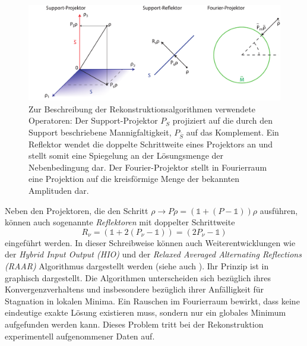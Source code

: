 \begin{figure}
	\centering
	\includegraphics[width=1\textwidth]{images/projektor.pdf}
	\caption[Operatoren zur Beschreibung der Rekonstruktionsalgorithmen]{Zur Beschreibung der Rekonstruktionsalgorithmen verwendete Operatoren: Der Support-Projektor $P_S$ projiziert auf die durch den Support beschriebene Mannigfaltigkeit, $P_{\bar{S}}$ auf das Komplement. Ein Reflektor wendet die doppelte Schrittweite eines Projektors an und stellt somit eine Spiegelung an der Lösungsmenge der Nebenbedingung dar. Der Fourier-Projektor stellt in Fourierraum eine Projektion auf die kreisförmige Menge der bekannten Amplituden dar.}
	\label{fig:projektoren}
\end{figure}
Neben den Projektoren, die den Schritt $\rho \rightarrow P\rho = (\mathbb{1}+(P-\mathbb{1}))\rho$ ausführen, können auch sogenannte \textit{Reflektoren} mit doppelter Schrittweite
\begin{equation}
	R_\nu= (\mathbb{1}+2(P_\nu-\mathbb{1}))=(2P_\nu-\mathbb{1})
\end{equation}
eingeführt werden.
In dieser Schreibweise können auch Weiterentwicklungen wie der \textit{Hybrid Input Output (HIO)} und  der \textit{Relaxed Averaged Alternating Reflections (RAAR)} Algorithmus dargestellt werden (siehe auch ). Ihr Prinzip ist in  graphisch dargestellt. Die Algorithmen unterscheiden sich bezüglich ihres Konvergenzverhaltens und insbesondere bezüglich ihrer Anfälligkeit für Stagnation in lokalen Minima. 
Ein Rauschen im Fourierraum bewirkt, dass keine eindeutige exakte Lösung existieren muss, sondern nur ein globales Minimum aufgefunden werden kann. Dieses Problem tritt bei der Rekonstruktion experimentell aufgenommener Daten auf.
